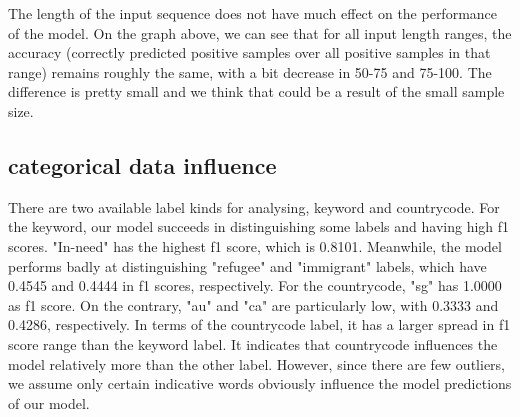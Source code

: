 \documentclass[11pt,a4paper]{article}
\begin{document}
The length of the input sequence does not have much effect on the performance of the model. On the graph above, we can see that for all input length ranges, the accuracy (correctly predicted positive samples over all positive samples in that range) remains roughly the same, with a bit decrease in 50-75 and 75-100. The difference is pretty small and we think that could be a result of the small sample size.
\subsection{categorical data influence}
There are two available label kinds for analysing, keyword and country\textunderscore code. For the keyword, our model succeeds in distinguishing some labels and having high f1 scores. "In-need" has the highest f1 score, which is 0.8101. Meanwhile, the model performs badly at distinguishing "refugee" and "immigrant" labels, which have 0.4545 and 0.4444 in f1 scores, respectively. For the country\textunderscore code, "sg" has 1.0000 as f1 score. On the contrary, "au" and "ca" are particularly low, with 0.3333 and 0.4286, respectively. In terms of the country\textunderscore code label, it has a larger spread in f1 score range than the keyword label. It indicates that country\textunderscore code influences the model relatively more than the other label. However, since there are few outliers, we assume only certain indicative words obviously influence the model predictions of our model.
\end{document}
